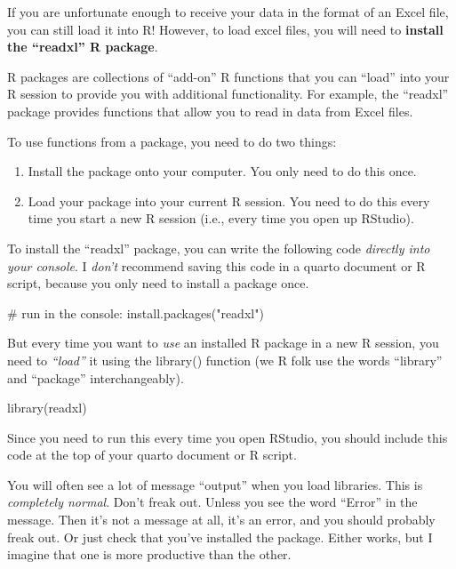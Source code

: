 \documentclass[
  letterpaper,
  DIV=11,
  numbers=noendperiod]{scrreprt}
\newenvironment{Shaded}{\begin{snugshade}}{\end{snugshade}}
\newcommand{\CommentTok}[1]{\textcolor[rgb]{0.37,0.37,0.37}{#1}}
\newcommand{\FunctionTok}[1]{\textcolor[rgb]{0.28,0.35,0.67}{#1}}
\newcommand{\NormalTok}[1]{\textcolor[rgb]{0.00,0.23,0.31}{#1}}
\newcommand{\StringTok}[1]{\textcolor[rgb]{0.13,0.47,0.30}{#1}}
\begin{document}
If you are unfortunate enough to receive your data in the format of an
Excel file, you can still load it into R! However, to load excel files,
you will need to \textbf{install the ``readxl'' R package}.

R packages are collections of ``add-on'' R functions that you can
``load'' into your R session to provide you with additional
functionality. For example, the ``readxl'' package provides functions
that allow you to read in data from Excel files.

To use functions from a package, you need to do two things:

\begin{enumerate}
\def\labelenumi{\arabic{enumi}.}
\item
  Install the package onto your computer. You only need to do this once.
\item
  Load your package into your current R session. You need to do this
  every time you start a new R session (i.e., every time you open up
  RStudio).
\end{enumerate}

To install the ``readxl'' package, you can write the following code
\emph{directly into your console}. I \emph{don't} recommend saving this
code in a quarto document or R script, because you only need to install
a package once.

\begin{Shaded}
\begin{Highlighting}[]
\CommentTok{\# run in the console: }
\FunctionTok{install.packages}\NormalTok{(}\StringTok{"readxl"}\NormalTok{)}
\end{Highlighting}
\end{Shaded}

But every time you want to \emph{use} an installed R package in a new R
session, you need to \emph{``load''} it using the library() function (we
R folk use the words ``library'' and ``package'' interchangeably).

\begin{Shaded}
\begin{Highlighting}[]
\FunctionTok{library}\NormalTok{(readxl)}
\end{Highlighting}
\end{Shaded}

Since you need to run this every time you open RStudio, you should
include this code at the top of your quarto document or R script.

You will often see a lot of message ``output'' when you load libraries.
This is \emph{completely normal}. Don't freak out. Unless you see the
word ``Error'' in the message. Then it's not a message at all, it's an
error, and you should probably freak out. Or just check that you've
installed the package. Either works, but I imagine that one is more
productive than the other.
\end{document}
